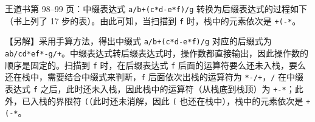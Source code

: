 \documentclass[10.5pt,a4paper,oneside]{article}
\begin{document}
\begin{jiexibox}

王道书第 98--99 页：中缀表达式 \texttt{a/b+(c*d-e*f)/g}
转换为后缀表达式的过程如下（书上列了 17 步的表）。由此可知，当扫描到
\texttt{f} 时，栈中的元素依次是 \texttt{+(-*}。

【另解】采用手算方法，得出中缀式 \texttt{a/b+(c*d-e*f)/g} 对应的后缀式为
\texttt{ab/cd*ef*-g/+}。中缀表达式转后缀表达式时，操作数都直接输出，因此操作数的顺序是固定的。扫描到
\texttt{f} 时，在后缀表达式 \texttt{f}
后面的运算符要么还未入栈，要么还在栈中，需要结合中缀式来判断，\texttt{f}
后面依次出栈的运算符为 \texttt{*-/+}，\texttt{/} 在中缀表达式 \texttt{f}
之后，此时还未入栈，因此栈中的运算符（从栈底到栈顶）为
\texttt{+-*}；此外，已入栈的界限符 \texttt{(}（此时还未消解，因此
\texttt{(} 也还在栈中），栈中的元素依次是 \texttt{+(-*}。

\end{jiexibox}
\end{document}

